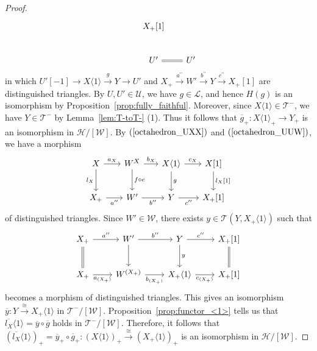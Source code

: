 \documentclass[a4paper,reqno,10pt]{amsart}
\theoremstyle{definition}
\theoremstyle{definition}
\theoremstyle{definition}
\theoremstyle{definition}
\theoremstyle{plain}
\newcommand{\CH}{\mathcal{H}}
\newcommand{\CL}{\mathcal{L}}
\newcommand{\CT}{\mathcal{T}}
\newcommand{\CU}{\mathcal{U}}
\newcommand{\CW}{\mathcal{W}}
\begin{document}
\begin{proof}
\begin{equation}
\begin{tikzcd}[row sep=0.8cm, column sep=0.6cm]
&X_+[1]
\\
{}
&U' \arrow[equal]{r}
&U'
\end{tikzcd}
\end{equation}
in which $U'[-1]\to X\langle1\rangle\xrightarrow{g}Y\to U'$ and $X_+\xrightarrow{a^{\prime\prime}}W'\xrightarrow{b^{\prime\prime}}Y\xrightarrow{c^{\prime\prime}}X_+[1]$ are distinguished triangles.
By $U,U'\in\CU$, we have $g\in\CL$, and hence $H(g)$ is an isomorphism by Proposition~\ref{prop:fully_faithful}. 
Moreover, since $X\langle1\rangle\in\CT^-$, we have $Y\in\CT^-$ by Lemma~\ref{lem:T-toT-} {\rm (1)}. Thus it follows that $\overline{g}_+\colon X\langle1\rangle_+\to Y_+$ is an isomorphism in $\CH/[\CW]$. By $(\ref{octahedron_UXX})$ and $(\ref{octahedron_UUW})$, we have a morphism
\[
\begin{tikzcd}[row sep=0.8cm, column sep=0.6cm]
X \arrow{r}{a_X}\arrow{d}[swap]{l_X}
&W^X \arrow{d}{f\circ e} \arrow{r}{b_X}
&X\langle1\rangle \arrow{r}{c_X} \arrow{d}{g}
&X[1] \arrow{d}{l_X[1]}
\\
X_+ \arrow{r}[swap]{a^{\prime\prime}}
&W'  \arrow{r}[swap]{b^{\prime\prime}}
&Y \arrow{r}[swap]{c^{\prime\prime}}
&X_+[1]
\end{tikzcd}
\]
of distinguished triangles. Since $W'\in\CW$, there exists $y\in\CT(Y,X_+\langle1\rangle)$ such that 
\[
\begin{tikzcd}[row sep=0.8cm, column sep=0.8cm]
X_+ \arrow{r}{a^{\prime\prime}}\arrow[d,equals]
&W' \arrow{d}{} \arrow{r}{b^{\prime\prime}}
&Y \arrow{r}{c^{\prime\prime}} \arrow{d}{y}
&X_+[1] \arrow[d,equals]
\\
X_+ \arrow{r}[swap]{a_{(X_+)}}
&W^{(X_+)}  \arrow{r}[swap]{b_{(X_+)}}
&X_+\langle1\rangle \arrow{r}[swap]{c_{(X_+)}}
&X_+[1]
\end{tikzcd}
\]
becomes a morphism of distinguished triangles.
This gives an isomorphism $\overline{y}\colon Y\xrightarrow{\cong} X_+\langle1\rangle$ in $\CT^-/[\CW]$. Proposition~\ref{prop:functor_<1>} tells us that $\overline{l_X}\langle1\rangle=\overline{y}\circ\overline{g}$ holds in $\CT^-/[\CW]$. Therefore, it follows that $(\overline{l_X}\langle1\rangle)_+=\overline{y}_+\circ\overline{g}_+\colon (X\langle1\rangle)_+\xrightarrow{\cong}(X_+\langle1\rangle)_+$ is an isomorphism in $\CH/[\CW]$. 
\normalcolor
\end{proof}
\end{document}
